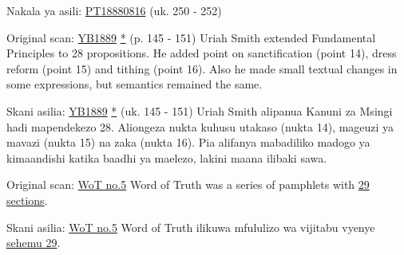 Nakala ya asili: \href{https://adventistdigitallibrary.org/adl-402854/present-truth-august-16-1888?view_only=true&solr_nav%5Bid%5D=ff4d7f3f77b9bdf9e9ac&solr_nav%5Bpage%5D=0&solr_nav%5Boffset%5D=13}{PT18880816} (uk. 250 - 252)






Original scan: \href{https://documents.adventistarchives.org/Yearbooks/YB1889.pdf#search=Yearbook%201889}{YB1889} \href{https://forgotten-pillar.s3.us-east-2.amazonaws.com/YB1889.pdf}{*} (p. 145 - 151) Uriah Smith extended Fundamental Principles to 28 propositions. He added point on sanctification (point 14), dress reform (point 15) and tithing (point 16). Also he made small textual changes in some expressions, but semantics remained the same.


Skani asilia: \href{https://documents.adventistarchives.org/Yearbooks/YB1889.pdf#search=Yearbook%201889}{YB1889} \href{https://forgotten-pillar.s3.us-east-2.amazonaws.com/YB1889.pdf}{*} (uk. 145 - 151) Uriah Smith alipanua Kanuni za Msingi hadi mapendekezo 28. Aliongeza nukta kuhusu utakaso (nukta 14), mageuzi ya mavazi (nukta 15) na zaka (nukta 16). Pia alifanya mabadiliko madogo ya kimaandishi katika baadhi ya maelezo, lakini maana ilibaki sawa.






Original scan: \href{https://adl.b2.adventistdigitallibrary.org/concern/published_works/4ffda25e-a06b-48d4-8ace-67cdcd33726f}{WoT no.5}
Word of Truth was a series of pamphlets with \href{https://adl.b2.adventistdigitallibrary.org/concern/parent/22267078_fundamental_principles_of_seventh_day_adventists/published_works/94a22141-33e8-4b9a-b397-2fe48c17bec4}{29 sections}.


Skani asilia: \href{https://adl.b2.adventistdigitallibrary.org/concern/published_works/4ffda25e-a06b-48d4-8ace-67cdcd33726f}{WoT no.5}
Word of Truth ilikuwa mfululizo wa vijitabu vyenye \href{https://adl.b2.adventistdigitallibrary.org/concern/parent/22267078_fundamental_principles_of_seventh_day_adventists/published_works/94a22141-33e8-4b9a-b397-2fe48c17bec4}{sehemu 29}.






